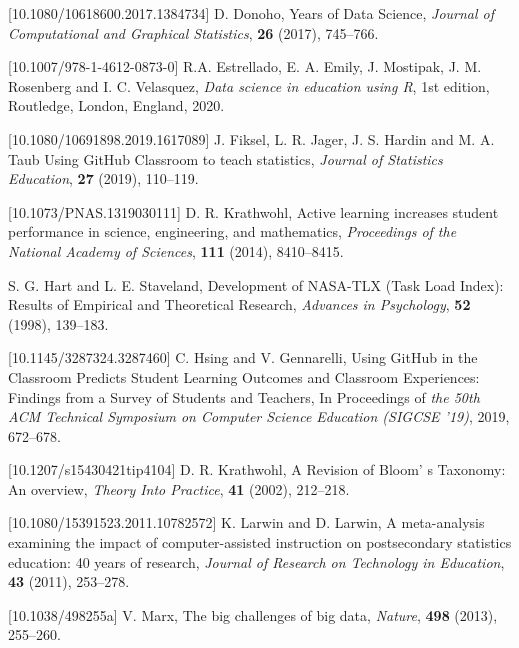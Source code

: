 \documentclass{aims}
\theoremstyle{definition}
\begin{document}
\begin{thebibliography}{99}
 [10.1080/10618600.2017.1384734]
     \newblock  D. Donoho,
      Years of Data Science,
     \newblock \emph{Journal of Computational and Graphical Statistics}, \textbf{26} (2017), 745--766.

 [10.1007/978-1-4612-0873-0]
     \newblock R.A. Estrellado, E. A. Emily, J. Mostipak, J. M. Rosenberg and I. C. Velasquez,
     \newblock \emph{Data science in education using R},
     \newblock 1st edition, Routledge, London, England, 2020.

 [10.1080/10691898.2019.1617089]
     \newblock J. Fiksel, L. R. Jager, J. S. Hardin and M. A. Taub
     \newblock Using GitHub Classroom to teach statistics,
     \newblock \emph{Journal of Statistics Education}, \textbf{27} (2019), 110--119.

 [10.1073/PNAS.1319030111]
     \newblock  D. R. Krathwohl,
     \newblock Active learning increases student performance in science, engineering, and mathematics,
     \newblock \emph{Proceedings of the National Academy of Sciences}, \textbf{111} (2014), 8410--8415.

     \newblock S. G. Hart and L. E. Staveland,
     \newblock Development of NASA-TLX (Task Load Index): Results of Empirical and Theoretical Research,
     \newblock \emph{Advances in Psychology}, \textbf{52} (1998), 139--183.

 [10.1145/3287324.3287460]
     \newblock C. Hsing and V. Gennarelli,
     \newblock Using GitHub in the Classroom Predicts Student Learning Outcomes and Classroom Experiences: Findings from a Survey of Students and Teachers,
     \newblock In Proceedings of \emph{the 50th ACM Technical Symposium on Computer Science Education (SIGCSE '19)}, 2019, 672–678.

 [10.1207/s15430421tip4104]
     \newblock  D. R. Krathwohl,
     \newblock A Revision of Bloom' s Taxonomy: An overview,
     \newblock \emph{Theory Into Practice}, \textbf{41} (2002), 212--218.

 [10.1080/15391523.2011.10782572]
     \newblock  K. Larwin and D. Larwin,
     \newblock A meta-analysis examining the impact of computer-assisted instruction on postsecondary statistics education: 40 years of research,
     \newblock \emph{Journal of Research on Technology in Education}, \textbf{43} (2011), 253--278.

 [10.1038/498255a]
     \newblock  V. Marx,
     \newblock The big challenges of big data,
     \newblock \emph{Nature}, \textbf{498} (2013), 255--260.


\end{thebibliography}
\end{document}
